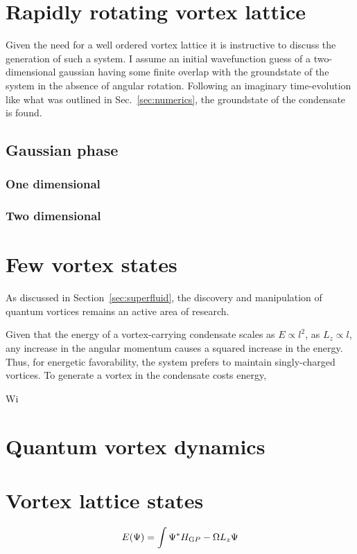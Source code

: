 \section{Rapidly rotating vortex lattice}
Given the need for a well ordered vortex lattice it is instructive to discuss the generation of such a system. I assume an initial wavefunction guess of a two-dimensional gaussian having some finite overlap with the groundstate of the system in the absence of angular rotation. Following an imaginary time-evolution like what was outlined in Sec.~\ref{sec:numerics}, the groundstate of the condensate is found.


\subsection{Gaussian phase}

\subsubsection{One dimensional}

\subsubsection{Two dimensional}



\section{Few vortex states}
As discussed in Section~\ref{sec:superfluid}, the discovery and manipulation of quantum vortices remains an active area of research.


Given that the energy of a vortex-carrying condensate scales as $E\propto l^2$, as $L_z \propto l$, any increase in the angular momentum causes a squared increase in the energy. Thus, for energetic favorability, the system prefers to maintain singly-charged vortices. To generate a vortex in the condensate costs energy,

Wi

\section{Quantum vortex dynamics}



\section{Vortex lattice states}
    \begin{equation}
        E(\Psi) = \int \Psi^{*} H_{\text GP} -\Omega L_z \Psi
    \end{equation}
